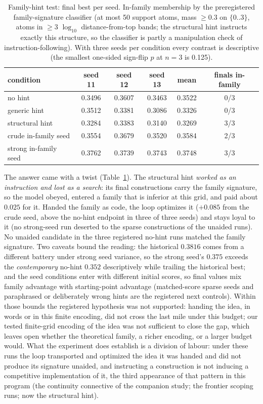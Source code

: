 \documentclass[11pt]{article}
\begin{document}
\begin{table}[t]
\centering\footnotesize
\setlength{\tabcolsep}{5pt}
\begin{tabular}{@{}lccccc@{}}
\toprule
condition & seed 11 & seed 12 & seed 13 & mean & finals in-family \\
\midrule
no hint & 0.3496 & 0.3607 & 0.3463 & 0.3522 & 0/3 \\
generic hint & 0.3512 & 0.3381 & 0.3086 & 0.3326 & 0/3 \\
structural hint & 0.3284 & 0.3383 & 0.3140 & 0.3269 & 3/3 \\
crude in-family seed & 0.3554 & 0.3679 & 0.3520 & 0.3584 & 2/3 \\
strong in-family seed & 0.3762 & 0.3739 & 0.3743 & 0.3748 & 3/3 \\
\bottomrule
\end{tabular}
\caption{Family-hint test: final best per seed. In-family membership by
the preregistered family-signature classifier (at most 50 support atoms,
mass $\ge 0.3$ on $\{0..3\}$, atoms in $\ge 3$ $\log_{10}$
distance-from-top bands; the structural hint instructs exactly this
structure, so the classifier is partly a manipulation check of
instruction-following). With three seeds per condition every contrast is
descriptive (the smallest one-sided sign-flip $p$ at $n{=}3$ is 0.125).}
\label{tab:hint}
\end{table}

The answer came with a twist (Table~\ref{tab:hint}). The structural
hint \emph{worked as an instruction and lost as a search}: its final
constructions carry the family signature, so the model obeyed, entered a
family that is inferior at this grid, and paid about $0.025$ for it.
Handed the family as code, the loop optimizes it ($+0.085$ from the
crude seed, above the no-hint endpoint in three of three seeds) and
stays loyal to it (no strong-seed run deserted to the sparse
constructions of the unaided runs). No unaided candidate in the three
registered no-hint runs matched the family signature. Two caveats bound the reading: the
historical $0.3816$ comes from a different battery under strong seed
variance, so the strong seed's $0.375$ exceeds the \emph{contemporary}
no-hint $0.352$ descriptively while trailing the historical best; and
the seed conditions enter with different initial scores, so final values
mix family advantage with starting-point advantage (matched-score sparse
seeds and paraphrased or deliberately wrong hints are the registered
next controls). Within those bounds the registered hypothesis was not
supported: handing the idea, in words or in this finite encoding, did
not cross the last mile under this budget; our tested finite-grid
encoding of the idea was not sufficient to close the gap, which leaves
open whether the theoretical family, a richer encoding, or a larger
budget would. What the experiment does establish is a division of
labour: under these runs the loop transported and optimized the idea it
was handed and did not produce its signature unaided, and instructing a
construction is not inducing a competitive implementation of it, the
third appearance of that pattern in this program (the continuity
connective of the companion study; the frontier scoping runs; now the
structural hint).
\end{document}
